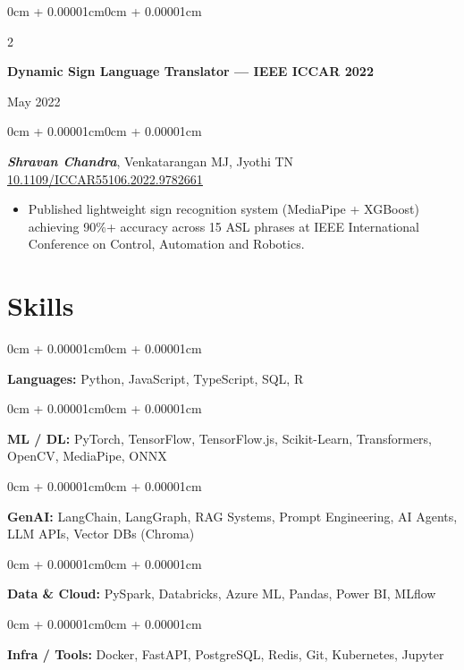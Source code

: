\documentclass[10pt, letterpaper]{article}
\newenvironment{highlights}{
    \begin{itemize}[
        topsep=0.08cm, parsep=0.08cm,
        partopsep=0pt, itemsep=0pt,
        leftmargin=0cm + 10pt
    ]
}{\end{itemize}}
\newenvironment{onecolentry}{
    \begin{adjustwidth}{0cm + 0.00001cm}{0cm + 0.00001cm}
}{\end{adjustwidth}}
\newenvironment{twocolentry}[2][]{
    \onecolentry
    \def\secondColumn{#2}
    \setcolumnwidth{\fill, 4.5cm}
    \begin{paracol}{2}
}{
    \switchcolumn \raggedleft \secondColumn
    \end{paracol}
    \endonecolentry
}
\begin{document}
\vspace{0.12cm}

\begin{twocolentry}{May 2022}
    \textbf{Dynamic Sign Language Translator --- IEEE ICCAR 2022}
\end{twocolentry}

\vspace{0.08cm}
\begin{onecolentry}
    \textbf{\textit{Shravan Chandra}}, Venkatarangan MJ, Jyothi TN \quad \href{https://doi.org/10.1109/ICCAR55106.2022.9782661}{\underline{10.1109/ICCAR55106.2022.9782661}}

    \vspace{0.06cm}
    \begin{highlights}
        \item Published lightweight sign recognition system (MediaPipe + XGBoost) achieving 90\%+ accuracy across 15 ASL phrases at IEEE International Conference on Control, Automation and Robotics.
    \end{highlights}
\end{onecolentry}

\vspace{0.1cm}

\section{Skills}

\begin{onecolentry}
    \textbf{Languages:} Python, JavaScript, TypeScript, SQL, R
\end{onecolentry}
\vspace{0.06cm}
\begin{onecolentry}
    \textbf{ML / DL:} PyTorch, TensorFlow, TensorFlow.js, Scikit-Learn, Transformers, OpenCV, MediaPipe, ONNX
\end{onecolentry}
\vspace{0.06cm}
\begin{onecolentry}
    \textbf{GenAI:} LangChain, LangGraph, RAG Systems, Prompt Engineering, AI Agents, LLM APIs, Vector DBs (Chroma)
\end{onecolentry}
\vspace{0.06cm}
\begin{onecolentry}
    \textbf{Data \& Cloud:} PySpark, Databricks, Azure ML, Pandas, Power BI, MLflow
\end{onecolentry}
\vspace{0.06cm}
\begin{onecolentry}
    \textbf{Infra / Tools:} Docker, FastAPI, PostgreSQL, Redis, Git, Kubernetes, Jupyter
\end{onecolentry}
\end{document}
